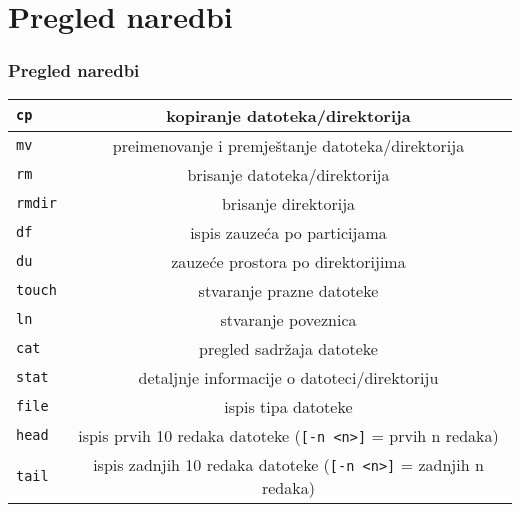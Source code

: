\documentclass{beamer}
\newcommand{\shell}[1]{\texttt{\small #1}}
\begin{document}
\section{Pregled naredbi}
\begin{frame}[t]
\frametitle{Pregled naredbi}
\begin{tabular}{| l | c |} \hline
  \shell{cp} & kopiranje datoteka/direktorija \\ \hline
  \shell{mv} & preimenovanje i premještanje datoteka/direktorija \\ \hline
  \shell{rm} & brisanje datoteka/direktorija \\ \hline
  \shell{rmdir} & brisanje direktorija \\ \hline
  \shell{df} & ispis zauzeća po particijama \\ \hline
  \shell{du} & zauzeće prostora po direktorijima \\ \hline
  \shell{touch} & stvaranje prazne datoteke \\ \hline
  \shell{ln} & stvaranje poveznica \\ \hline
  \shell{cat} & pregled sadržaja datoteke \\ \hline
  \shell{stat} & detaljnje informacije o datoteci/direktoriju \\ \hline
  \shell{file} & ispis tipa datoteke \\ \hline
  \shell{head} & ispis prvih 10 redaka datoteke (\shell{[-n <n>]} = prvih n redaka) \\ \hline
  \shell{tail} & ispis zadnjih 10 redaka datoteke (\shell{[-n <n>]} = zadnjih n redaka) \\ \hline


\end{tabular}
\end{frame}
\end{document}
